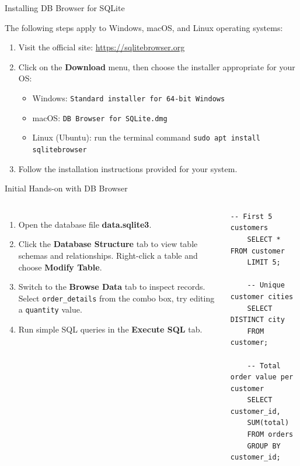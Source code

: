 \documentclass[aspectratio=169, table]{beamer}
\begin{document}
\begin{frame}{Installing DB Browser for SQLite}
\vspace{20pt}

The following steps apply to Windows, macOS, and Linux operating systems:

\begin{enumerate}
\item Visit the official site: \url{https://sqlitebrowser.org}
\item Click on the \textbf{Download} menu, then choose the installer appropriate for your OS:
\begin{itemize}
	\item Windows: \texttt{Standard installer for 64-bit Windows}
	\item macOS: \texttt{DB Browser for SQLite.dmg}
	\item Linux (Ubuntu): run the terminal command \texttt{sudo apt install sqlitebrowser}
\end{itemize}
\item Follow the installation instructions provided for your system.
\end{enumerate}
\end{frame}

\begin{frame}[fragile]{Initial Hands-on with DB Browser}
\vspace{20pt}

\begin{columns}[T,onlytextwidth]
\begin{enumerate}
	\item Open the database file \textbf{data.sqlite3}.
	\item Click the \textbf{Database Structure} tab to view table schemas and relationships. Right-click a table and choose \textbf{Modify Table}.
	\item Switch to the \textbf{Browse Data} tab to inspect records. Select \texttt{order\_details} from the combo box, try editing a \texttt{quantity} value.
	\item Run simple SQL queries in the \textbf{Execute SQL} tab.
\end{enumerate}

\begin{lstlisting}[style=SqlStyle]
	-- First 5 customers
	SELECT * FROM customer 
	LIMIT 5;
	
	-- Unique customer cities
	SELECT DISTINCT city 
	FROM customer;
	
	-- Total order value per customer
	SELECT customer_id, 
	SUM(total)
	FROM orders
	GROUP BY customer_id;
\end{lstlisting}

\end{columns}
\end{frame}
\end{document}
